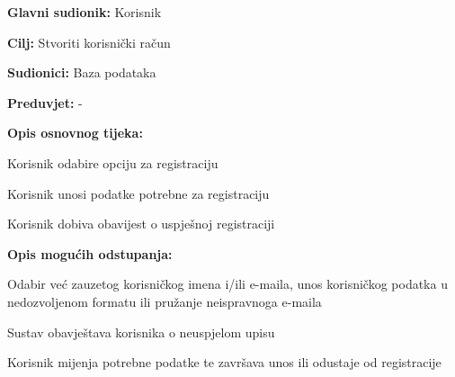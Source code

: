 				\noindent {}
				\begin{packed_item}
					
					\item \textbf{Glavni sudionik: } Korisnik
					\item  \textbf{Cilj:} Stvoriti korisnički račun
					\item  \textbf{Sudionici:} Baza podataka
					\item  \textbf{Preduvjet:} - 
					\item  \textbf{Opis osnovnog tijeka:}
					
					\item[] \begin{packed_enum}
						\item Korisnik odabire opciju za registraciju
						\item Korisnik unosi podatke potrebne za registraciju
						\item Korisnik dobiva obavijest o uspješnoj registraciji
					\end{packed_enum}
					\item  \textbf{Opis mogućih odstupanja:}
					\item[] \begin{packed_item}
						
						
						
						\item[2.a]      Odabir već zauzetog korisničkog imena i/ili e-maila, unos korisničkog podatka u nedozvoljenom formatu ili pružanje neispravnoga e-maila
						\item[] \begin{packed_enum}
							\item         Sustav obavještava korisnika o neuspjelom upisu
							\item         Korisnik mijenja potrebne podatke te završava unos ili odustaje od registracije
						\end{packed_enum}
					\end{packed_item}
				\end{packed_item}
				
				\pagebreak
				
